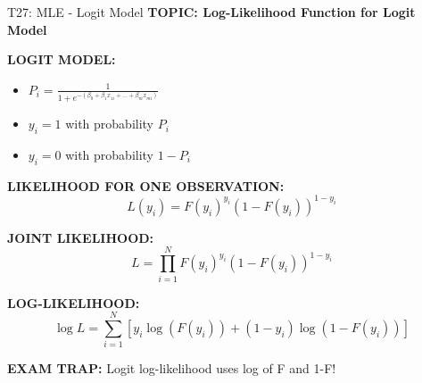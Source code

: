 \documentclass[8pt]{beamer}
\begin{document}
	\begin{frame}{T27: MLE - Logit Model}
		\fontsize{6.5}{7.5}\selectfont
		\textbf{TOPIC: Log-Likelihood Function for Logit Model}
		
		\vspace{0.1cm}
		\textbf{LOGIT MODEL:}
		\begin{itemize}
			\item $P_i = \frac{1}{1 + e^{-(\beta_0 + \beta_1 x_{1i} + ... + \beta_m x_{mi})}}$
			\item $y_i = 1$ with probability $P_i$
			\item $y_i = 0$ with probability $1-P_i$
		\end{itemize}
		
		\vspace{0.1cm}
		\textbf{LIKELIHOOD FOR ONE OBSERVATION:}
		\[
		L(y_i) = F(y_i)^{y_i}(1-F(y_i))^{1-y_i}
		\]
		
		\vspace{0.1cm}
		\textbf{JOINT LIKELIHOOD:}
		\[
		L = \prod_{i=1}^N F(y_i)^{y_i}(1-F(y_i))^{1-y_i}
		\]
		
		\vspace{0.1cm}
		\textbf{LOG-LIKELIHOOD:}
		\[
		\log L = \sum_{i=1}^N [y_i \log(F(y_i)) + (1-y_i)\log(1-F(y_i))]
		\]
		
		\textcolor{myred}{\textbf{EXAM TRAP:}} Logit log-likelihood uses \textcolor{myblue}{log of F and 1-F}!
	\end{frame}
	
\end{document}
